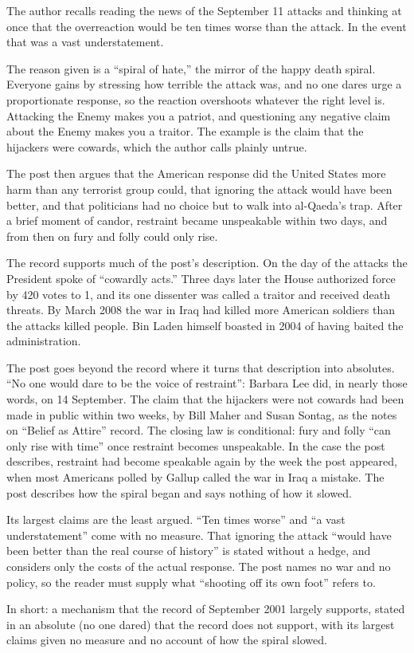 \begin{afterword}
\summaryhead

The author recalls reading the news of the September 11 attacks and thinking at once that the overreaction would be ten times worse than the attack. In the event that was a vast understatement.

The reason given is a ``spiral of hate,'' the mirror of the happy death spiral. Everyone gains by stressing how terrible the attack was, and no one dares urge a proportionate response, so the reaction overshoots whatever the right level is. Attacking the Enemy makes you a patriot, and questioning any negative claim about the Enemy makes you a traitor. The example is the claim that the hijackers were cowards, which the author calls plainly untrue.

The post then argues that the American response did the United States more harm than any terrorist group could, that ignoring the attack would have been better, and that politicians had no choice but to walk into al-Qaeda's trap. After a brief moment of candor, restraint became unspeakable within two days, and from then on fury and folly could only rise.

\responsehead

The record supports much of the post's description. On the day of the attacks the President spoke of ``cowardly acts.'' Three days later the House authorized force by 420 votes to 1, and its one dissenter was called a traitor and received death threats. By March 2008 the war in Iraq had killed more American soldiers than the attacks killed people. Bin Laden himself boasted in 2004 of having baited the administration.

The post goes beyond the record where it turns that description into absolutes. ``No one would dare to be the voice of restraint'': Barbara Lee did, in nearly those words, on 14 September. The claim that the hijackers were not cowards had been made in public within two weeks, by Bill Maher and Susan Sontag, as the notes on ``Belief as Attire'' record. The closing law is conditional: fury and folly ``can only rise with time'' once restraint becomes unspeakable. In the case the post describes, restraint had become speakable again by the week the post appeared, when most Americans polled by Gallup called the war in Iraq a mistake. The post describes how the spiral began and says nothing of how it slowed.

Its largest claims are the least argued. ``Ten times worse'' and ``a vast understatement'' come with no measure. That ignoring the attack ``would have been better than the real course of history'' is stated without a hedge, and considers only the costs of the actual response. The post names no war and no policy, so the reader must supply what ``shooting off its own foot'' refers to.

In short: a mechanism that the record of September 2001 largely supports, stated in an absolute (no one dared) that the record does not support, with its largest claims given no measure and no account of how the spiral slowed.
\end{afterword}
